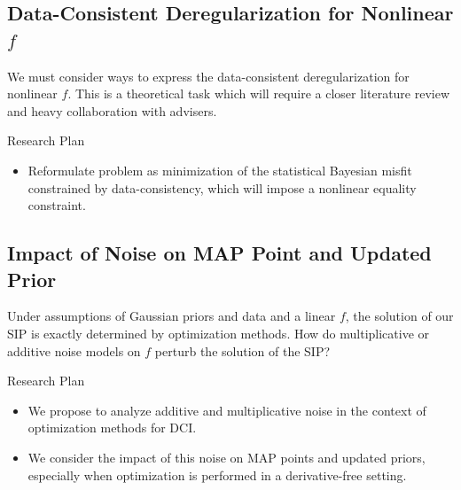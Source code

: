 \documentclass[11pt]{beamer}
\begin{document}
\subsection{Data-Consistent Deregularization for Nonlinear $f$}

\begin{frame}

We must consider ways to express the data-consistent deregularization for nonlinear $f$. This is a theoretical task which will require a closer literature review and heavy collaboration with advisers.

\begin{block}{Research Plan}

\begin{itemize}

	\item Reformulate problem as minimization of the statistical Bayesian misfit constrained by data-consistency, which will impose a nonlinear equality constraint.
	
	
\end{itemize}

\end{block}


\end{frame}

\subsection{Impact of Noise on MAP Point and Updated Prior}

\begin{frame}

Under assumptions of Gaussian priors and data and a linear $f$, the solution of our SIP is exactly determined  by optimization methods.  
How do multiplicative or additive noise models on $f$ perturb the solution of the SIP?

\begin{block}{Research Plan}
\begin{itemize}
	
		
	
	\item We propose to analyze additive and multiplicative noise in the context of optimization methods for DCI. 
	\item We consider the impact of this noise on MAP points and updated priors, especially when optimization is performed in a derivative-free setting.
	
\end{itemize}


\end{block}



\end{frame}
\end{document}
